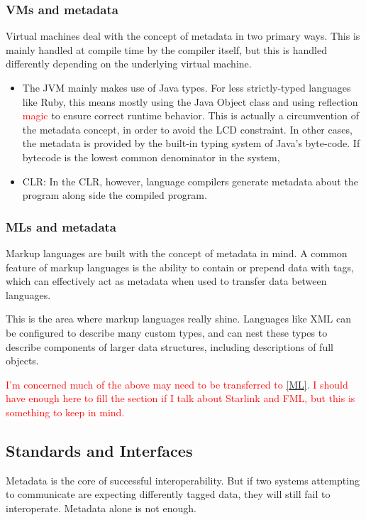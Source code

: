 \documentclass{sig-alternate}
\newcommand{\mycomment}[1]{\textcolor{red}{#1}}
\begin{document}
\subsubsection*{VMs and metadata}
Virtual machines deal with the concept of metadata in two primary ways. This is mainly handled at compile time by the compiler itself, but this is handled differently depending on the underlying virtual machine.
\begin{itemize}
\item The JVM mainly makes use of Java types. For less strictly-typed languages like Ruby, this means mostly using the Java Object class and using reflection \mycomment{magic} to ensure correct runtime behavior. This is actually a circumvention of the metadata concept, in order to avoid the LCD constraint. In other cases, the metadata is provided by the built-in typing system of Java's byte-code. If bytecode is the lowest common denominator in the system, 
\item CLR: In the CLR, however, language compilers generate metadata about the program along side the compiled program\cite{Hamilton:2003}.
\end{itemize}

\subsubsection*{MLs and metadata}
Markup languages are built with the concept of metadata in mind. A common feature of markup languages is the ability to contain or prepend data with tags, which can effectively act as metadata when used to transfer data between languages.

This is the area where markup languages really shine. Languages like XML can be configured to describe many custom types, and can nest these types to describe components of larger data structures, including descriptions of full objects.

\mycomment{I'm concerned much of the above may need to be transferred to \ref{ML}. I should have enough here to fill the section if I talk about Starlink and FML, but this is something to keep in mind.}

\subsection{Standards and Interfaces}\label{standards}
Metadata is the core of successful interoperability. But if two systems attempting to communicate are expecting differently tagged data, they will still fail to interoperate. Metadata alone is not enough.
\end{document}

